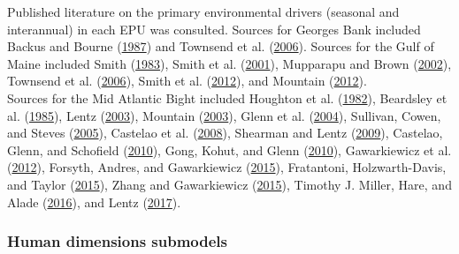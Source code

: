\documentclass[
]{book}
\begin{document}
Published literature on the primary environmental drivers (seasonal and interannual) in each EPU was consulted.
Sources for Georges Bank included Backus and Bourne (\protect\hyperlink{ref-backus_georges_1987}{1987}) and Townsend et al. (\protect\hyperlink{ref-townsend_oceanography_2006}{2006}).
Sources for the Gulf of Maine included Smith (\protect\hyperlink{ref-smith_mean_1983}{1983}), Smith et al. (\protect\hyperlink{ref-smith_interannual_2001}{2001}), Mupparapu and Brown (\protect\hyperlink{ref-mupparapu_role_2002}{2002}), Townsend et al. (\protect\hyperlink{ref-townsend_oceanography_2006}{2006}), Smith et al. (\protect\hyperlink{ref-smith_regime_2012}{2012}), and Mountain (\protect\hyperlink{ref-mountain_labrador_2012}{2012}).\\
Sources for the Mid Atlantic Bight included Houghton et al. (\protect\hyperlink{ref-houghton_middle_1982}{1982}), Beardsley et al. (\protect\hyperlink{ref-beardsley_nantucket_1985}{1985}), Lentz (\protect\hyperlink{ref-lentz_climatology_2003}{2003}), Mountain (\protect\hyperlink{ref-mountain_variability_2003}{2003}), Glenn et al. (\protect\hyperlink{ref-glenn_biogeochemical_2004}{2004}), Sullivan, Cowen, and Steves (\protect\hyperlink{ref-sullivan_evidence_2005}{2005}), Castelao et al. (\protect\hyperlink{ref-castelao_seasonal_2008}{2008}), Shearman and Lentz (\protect\hyperlink{ref-shearman_long-term_2009}{2009}), Castelao, Glenn, and Schofield (\protect\hyperlink{ref-castelao_temperature_2010}{2010}), Gong, Kohut, and Glenn (\protect\hyperlink{ref-gong_seasonal_2010}{2010}), Gawarkiewicz et al. (\protect\hyperlink{ref-gawarkiewicz_direct_2012}{2012}), Forsyth, Andres, and Gawarkiewicz (\protect\hyperlink{ref-forsyth_recent_2015}{2015}), Fratantoni, Holzwarth-Davis, and Taylor (\protect\hyperlink{ref-fratantoni_description_2015}{2015}), Zhang and Gawarkiewicz (\protect\hyperlink{ref-zhang_dynamics_2015}{2015}), Timothy J. Miller, Hare, and Alade (\protect\hyperlink{ref-miller_state-space_2016}{2016}), and Lentz (\protect\hyperlink{ref-lentz_seasonal_2017}{2017}).

\hypertarget{human-dimensions-submodels}{%
\subsubsection{Human dimensions submodels}\label{human-dimensions-submodels}}
\end{document}
